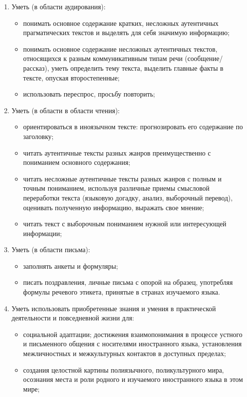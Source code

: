 \begin{enumerate}
\item Уметь (в области аудирования):
	\begin{itemize}
	\item понимать основное содержание кратких, несложных аутентичных прагматических текстов и выделять для себя значимую информацию;
	\item понимать основное содержание несложных аутентичных текстов, относящихся к разным коммуникативным типам речи (сообщение/рассказ), уметь определить тему текста, выделить главные факты в тексте, опуская второстепенные;
	\item использовать переспрос, просьбу повторить;
	\end{itemize}
\item Уметь (в области в области чтения):
	\begin{itemize}
	\item ориентироваться в иноязычном тексте: прогнозировать его содержание по заголовку;
	\item  читать аутентичные тексты разных жанров преимущественно с пониманием основного содержания;
	\item читать несложные аутентичные тексты разных жанров с полным и точным пониманием, используя различные приемы смысловой переработки текста (языковую догадку, анализ, выборочный перевод), оценивать полученную информацию, выражать свое мнение;
	\item читать текст с выборочным пониманием нужной или интересующей информации;
	\end{itemize}
\item Уметь (в области письма):
	\begin{itemize}
	\item заполнять анкеты и формуляры;
	\item писать поздравления, личные письма с опорой на образец, употребляя формулы речевого этикета, принятые в странах изучаемого языка.
	\end{itemize}
\item Уметь использовать приобретенные знания и умения в практической деятельности и повседневной жизни для:
	\begin{itemize}
	\item социальной адаптации; достижения взаимопонимания в процессе устного и письменного общения с носителями иностранного языка, установления межличностных и межкультурных контактов в доступных пределах;
	\item создания целостной картины полиязычного, поликультурного мира, осознания места и роли родного и изучаемого иностранного языка в этом мире;

\end{itemize}
\end{enumerate}
